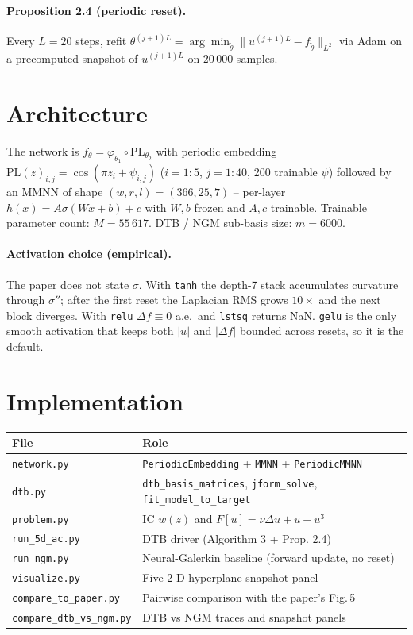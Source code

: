 \documentclass[11pt]{article}
\newcommand{\code}[1]{\texttt{\small #1}}
\begin{document}
\paragraph{Proposition 2.4 (periodic reset).} Every $L=20$ steps, refit
$\theta^{(j+1)L} = \arg\min_{\tilde\theta} \| u^{(j+1)L} - f_{\tilde\theta}\|_{L^2}$
via Adam on a precomputed snapshot of $u^{(j+1)L}$ on 20\,000 samples.

\section{Architecture}

The network is $f_\theta = \varphi_{\theta_1}\circ\mathrm{PL}_{\theta_2}$
with periodic embedding
$\mathrm{PL}(z)_{i,j} = \cos(\pi z_i + \psi_{i,j})$ ($i=1{:}5$,
$j=1{:}40$, 200 trainable $\psi$) followed by an MMNN of shape
$(w,r,l)=(366,25,7)$ -- per-layer
$h(x) = A\sigma(Wx+b)+c$ with $W,b$ frozen and $A,c$ trainable.
Trainable parameter count: $M=55\,617$. DTB / NGM sub-basis size:
$m=6000$.

\paragraph{Activation choice (empirical).} The paper does not state
$\sigma$. With \code{tanh} the depth-7 stack accumulates curvature
through $\sigma''$; after the first reset the Laplacian RMS grows
$10\times$ and the next block diverges. With \code{relu}
$\Delta f \equiv 0$ a.e.\ and \code{lstsq} returns NaN. \code{gelu} is
the only smooth activation that keeps both $|u|$ and $|\Delta f|$
bounded across resets, so it is the default.

\section{Implementation}

\begin{center}
\begin{tabular}{ll}
  \toprule
  File & Role \\
  \midrule
  \code{network.py}       & \code{PeriodicEmbedding} + \code{MMNN} + \code{PeriodicMMNN}\\
  \code{dtb.py}           & \code{dtb\_basis\_matrices}, \code{jform\_solve}, \code{fit\_model\_to\_target}\\
  \code{problem.py}       & IC $w(z)$ and $F[u]=\nu\Delta u + u - u^3$\\
  \code{run\_5d\_ac.py}   & DTB driver (Algorithm 3 + Prop. 2.4)\\
  \code{run\_ngm.py}      & Neural-Galerkin baseline (forward update, no reset)\\
  \code{visualize.py}     & Five 2-D hyperplane snapshot panel\\
  \code{compare\_to\_paper.py}    & Pairwise comparison with the paper's Fig.\,5\\
  \code{compare\_dtb\_vs\_ngm.py} & DTB vs NGM traces and snapshot panels\\
  \bottomrule
\end{tabular}
\end{center}
\end{document}
